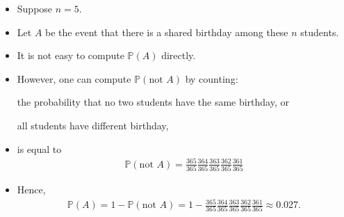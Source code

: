 \documentclass[9pt,xcolor=dvipsnames,table]{beamer}
\begin{document}
\begin{frame}[fragile,t] %
  \begin{itemize}
    \item Suppose $n=5$.
    \item Let $A$ be the event that there is a shared birthday among these $n$ students.
    \item It is not easy to compute $\mathbb{P}(A)$ directly.
    \item However, one can compute $\mathbb{P}\left(\text{not $A$}\right)$ by counting: \bigskip
      \begin{center}
        the probability that no two students have the same birthday, or\\
        \bigskip

				all students have different birthday,
			\end{center}
			\bigskip
		\item[] is equal to
			 \begin{align*}
         \mathbb{P}\left(\text{not $A$}\right) = \frac{365}{365} \frac{364}{365} \frac{363}{365} \frac{362}{365} \frac{361}{365}
			\end{align*}
	\item Hence,
		\begin{align*}
      \mathbb{P}(A) = 1 - \mathbb{P}\left(\text{not $A$}\right) = 1- \frac{365}{365} \frac{364}{365} \frac{363}{365} \frac{362}{365} \frac{361}{365}
			\approx 0.027.
		\end{align*}
	\end{itemize}
\end{frame}
\end{document}
